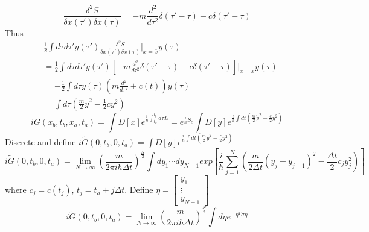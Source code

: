 \documentclass[a4paper,11pt]{article}
\begin{document}
\begin{equation*}
  \frac{\delta^2 S}{\delta x(\tau')\delta x(\tau)}=-m\frac{d^2}{d\tau^2}\delta(\tau'-\tau)-c\delta(\tau'-\tau)
\end{equation*}
Thus
\begin{equation*}
  \begin{split}
     &\frac{1}{2}\int d\tau d\tau'y(\tau')\frac{\delta^2S}{\delta x(\tau')\delta x(\tau)}|_{x=\bar{x}}y(\tau)\\
       &=\frac{1}{2}\int d\tau d\tau'y(\tau')\left[-m\frac{d^2}{d\tau^2}\delta(\tau'-\tau)-c\delta(\tau'-\tau)\right]|_{x=\bar{x}}y(\tau)\\
       &=-\frac{1}{2}\int d\tau y(\tau)(m\frac{d^2}{d\tau^2}+c(t))y(\tau)\\
       &=\int d\tau(\frac{m}{2}\dot{y}^2-\frac{1}{2}cy^2)
  \end{split}
\end{equation*}
\begin{equation*}
  iG(x_b,t_b,x_a,t_a)=\int D[x]e^{\frac{i}{\hbar}\int_{t_a}^{t_b}d\tau L}=e^{\frac{i}{\hbar}S_c}\int D[y]e^{\frac{i}{\hbar}\int dt(\frac{m}{2}\dot{y}^2-\frac{c}{2}y^2)}
\end{equation*}
Discrete and define $i\tilde{G}(0,t_b,0,t_a)=\int D[y]e^{\frac{i}{\hbar}\int dt(\frac{m}{2}\dot{y}^2-\frac{c}{2}y^2)}$
\begin{equation*}
  i\tilde{G}(0,t_b,0,t_a)=\lim_{N\to\infty}\left(\frac{m}{2\pi i\hbar\Delta t}\right)^{\frac{N}{2}}\int dy_1\cdots dy_{N-1}exp\left[\frac{i}{\hbar}\sum_{j=1}^{N}\left(\frac{m}{2\Delta t}(y_j-y_{j-1})^2-\frac{\Delta t}{2}c_jy_j^2\right)\right]
\end{equation*}
where $c_j=c(t_j),\,t_j=t_a+j\Delta t$. Define $\eta=\begin{bmatrix}
                                                       y_1 \\
                                                       \vdots \\
                                                       y_{N-1}
                                                     \end{bmatrix}$
\begin{equation*}
  i\tilde{G}(0,t_b,0,t_a)=\lim_{N\to\infty}\left(\frac{m}{2\pi i\hbar\Delta t}\right)^{\frac{N}{2}}\int d\eta e^{-\eta^T\sigma\eta}
\end{equation*}
\end{document}
